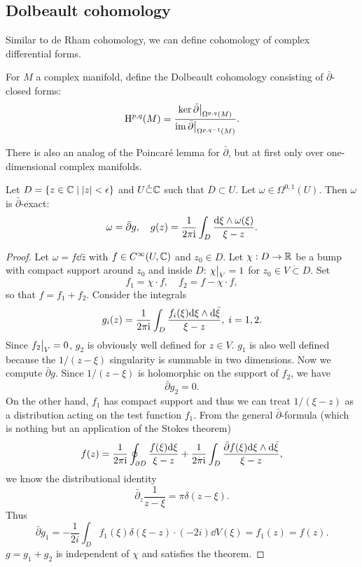 \subsection{Dolbeault cohomology}

Similar to de Rham cohomology, we can define cohomology of complex differential forms.

\begin{defn}
    For $M$ a complex manifold, define the Dolbeault cohomology consisting of $\bar\partial$-closed forms:
    \[\rmH^{p,q}(M)=\frac{\ker \restr{\bar\partial}{\Omega^{p,q}(M)}}{\restr{\im\bar\partial}{\Omega^{p,q-1}(M)}}.\]
\end{defn}

There is also an analog of the Poincar\'e lemma for $\bar\partial$, but at first only over one-dimensional complex manifolds.

\begin{lem}
    Let $D=\{z\in\mathbb{C}\mid |z|<\epsilon\}$ and $U\mathring\subset \mathbb{C}$ such that $\overline{D}\subset U$. Let $\omega\in \Omega^{0,1}(U)$. Then $\omega$ is $\bar\partial$-exact:
    \[\omega=\bar\partial g,\quad g(z)=\frac{1}{2\pi\mathrm{i} }\int_{D}\frac{{\mathrm{d}}\xi\wedge \omega(\xi)}{\xi-z}.\]
\end{lem}
\begin{proof}
    Let $\omega=f\dd\bar z$ with $f\in C^\infty(U,\mathbb{C})$ and $z_0\in D$. Let $\chi:D\to\mathbb{R}$ be a bump with compact support around $z_0$ and inside $D$: $\restr{\chi}{V}=1$ for $z_0\in V\mathring\subset D$. Set
    \[f_1=\chi\cdot f,\quad f_2=f-\chi\cdot f,\]
    so that $f=f_1+f_2$. Consider the integrals
    \[g_i(z)=\frac{1}{2\pi\mathrm{i} }\int_{D}\frac{f_i(\xi){\mathrm{d}}\xi\wedge {\mathrm{d}}\bar\xi}{\xi-z},\; i=1,2.\]
    Since $\restr{f_2}{V}=0$, $g_2$ is obviously well defined for $z\in V$. $g_1$ is also well defined because the $1/(z-\xi)$ singularity is summable in two dimensions. Now we compute $\bar\partial g$. Since $1/(z-\xi)$ is holomorphic on the support of $f_2$, we have
    \[\bar\partial g_2=0.\]
    On the other hand, $f_1$ has compact support and thus we can treat $1/(\xi-z)$ as a distribution acting on the test function $f_1$. From the general $\bar\partial$-formula (which is nothing but an application of the Stokes theorem)
    \[f(z)=\frac{1}{2\pi\mathrm{i} }\oint_{\partial D}\frac{f(\xi){\mathrm{d}}\xi}{\xi-z}+\frac{1}{2\pi\mathrm{i} }\int_D\frac{\bar\partial f(\xi){\mathrm{d}}\xi\wedge{\mathrm{d}}\bar \xi}{\xi-z},\]
    we know the distributional identity
    \[\bar\partial_z \frac{1}{z-\xi}=\pi\delta(z-\xi).\]
    Thus 
    \[\bar\partial g_1=-\frac{1}{2 i}\int_D f_1(\xi)\delta(\xi-z)\cdot (-2i)\dd V(\xi)=f_1(z)=f(z).\]
    $g=g_1+g_2$ is independent of $\chi$ and satisfies the theorem.
\end{proof}

